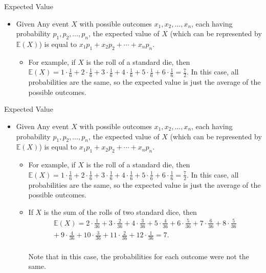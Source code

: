 \documentclass[9pt]{beamer}
\begin{document}
\begin{frame}[fragile, t]{Expected Value}
    \begin{itemize}
        \item Given Any event $X$ with possible outcomes $x_1,x_2,\ldots,x_n$, each having probability $p_1,p_2,\ldots,p_n$, the expected value of $X$ (which can be represented by $\mathbb{E}(X)$) is equal to $x_1p_1+x_2p_2+\cdots+x_np_n$.
        \begin{itemize}
            \item For example, if $X$ is the roll of a standard die, then $\mathbb{E}(X)=1\cdot\frac{1}{6}+2\cdot\frac{1}{6}+3\cdot\frac{1}{6}+4\cdot\frac{1}{6}+5\cdot\frac{1}{6}+6\cdot\frac{1}{6}=\frac{7}{2}$. In this case, all probabilities are the same, so the expected value is just the average of the possible outcomes.
           
                
        \end{itemize}
        
    \end{itemize}
    
    
\end{frame}


\begin{frame}[fragile, t]{Expected Value}
    \begin{itemize}
        \item Given Any event $X$ with possible outcomes $x_1,x_2,\ldots,x_n$, each having probability $p_1,p_2,\ldots,p_n$, the expected value of $X$ (which can be represented by $\mathbb{E}(X)$) is equal to $x_1p_1+x_2p_2+\cdots+x_np_n$.
        \begin{itemize}
            \item For example, if $X$ is the roll of a standard die, then $\mathbb{E}(X)=1\cdot\frac{1}{6}+2\cdot\frac{1}{6}+3\cdot\frac{1}{6}+4\cdot\frac{1}{6}+5\cdot\frac{1}{6}+6\cdot\frac{1}{6}=\frac{7}{2}$. In this case, all probabilities are the same, so the expected value is just the average of the possible outcomes.
            \item If $X$ is the sum of the rolls of two standard dice, then
            \begin{gather*}
                \mathbb{E}(X)=2\cdot\frac{1}{36}+3\cdot\frac{2}{36}+4\cdot\frac{3}{36}+5\cdot\frac{4}{36}+6\cdot\frac{5}{36}+7\cdot\frac{6}{36}+8\cdot\frac{5}{36} \\ +\ 9\cdot\frac{4}{36}+10\cdot\frac{3}{36}  +11\cdot\frac{2}{36}+12\cdot\frac{1}{36}=7.
            \end{gather*}\\
            Note that in this case, the probabilities for each outcome were not the same.
                
        \end{itemize}
        
    \end{itemize}
    
    
\end{frame}
\end{document}

